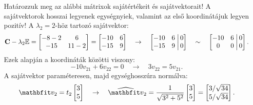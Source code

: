 \begin{exercise}{%
    Határozzuk meg az alábbi mátrixok sajátértékeit és sajátvektorait!
    A sajátvektorok hosszai legyenek egységnyiek, valamint az első koordinátájuk
    legyen pozitív!
  }
{  A $\lambda_2 = 2$-höz tartozó sajátvektor:
  \[
    \mathbf{C} - \lambda_2 {\mathbb{E}} = \begin{bmatrix}
      -8 - 2 & 6      \\
      -15    & 11 - 2
    \end{bmatrix} = \begin{bmatrix}
      -10 & 6 \\
      -15 & 9
    \end{bmatrix}
    \quad \rightarrow \quad
    \left[\begin{matrix}
        -10 & 6 \\
        -15 & 9
      \end{matrix}\right.\left|\begin{matrix}
        \,0 \\ \,0
      \end{matrix}\right]
    \quad \sim \quad
    \left[\begin{matrix}
        -10 & 6 \\
        0   & 0
      \end{matrix}\right.\left|\begin{matrix}
        \,0 \\ \,0
      \end{matrix}\right]
    \text{.}
  \]
  Ezek alapján a koordináták közötti viszony:
  \[
    -10v_{21} + 6v_{22} = 0
    \quad \rightarrow \quad
    3v_{22} = 5v_{21}
    \text{.}
  \]
  A sajátvektor paraméteresen, majd egységhosszúra normálva:
  \[
    \rvec v_2 = t_2 \begin{bmatrix}
      3 \\ 5
    \end{bmatrix}
    \quad
    \rightarrow
    \quad
    \uvec v_2 = \frac{1}{\sqrt{3^2 + 5^2}}\begin{bmatrix}
      3 \\ 5
    \end{bmatrix} = \begin{bmatrix}
      3 / \sqrt{34} \\
      5 / \sqrt{34}
    \end{bmatrix}
    \text{.}
  \]
  }
\end{exercise}
